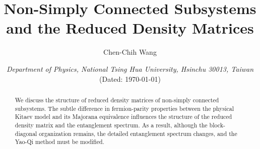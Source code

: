 \documentclass[12font]{article}
\title{\textbf{Non-Simply Connected Subsystems and the Reduced Density Matrices}}
\author{Chen-Chih Wang  }
\date{\textit{Department of Physics, National Tsing Hua University, Hsinchu 30013, Taiwan} \\ (Dated: \today)}
\theoremstyle{definition}
\begin{document}
\maketitle
\renewcommand\qedsymbol{$\blacksquare$}



\fontsize{12pt}{16pt}\selectfont

\begin{abstract}
    We discuss the structure of reduced density matrices of non-simply connected subsystems. The subtle difference in fermion-parity properties between the physical Kitaev model and its Majorana equivalence influences the structure of the reduced density matrix and the entanglement spectrum. As a result, although the block-diagonal organization remains, the detailed entanglement spectrum changes, and the Yao-Qi method must be modified. 
\end{abstract}

\end{document}
